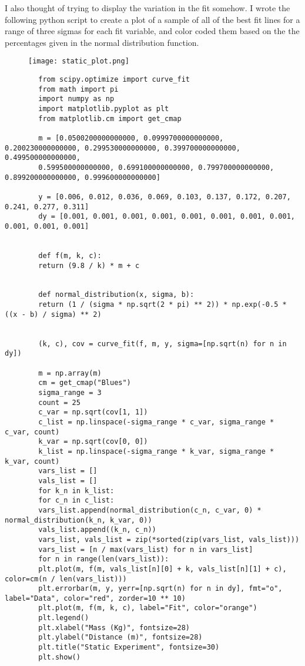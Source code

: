 \documentclass{article}
\begin{document}
    I also thought of trying to display the variation in the fit somehow. I wrote the following python script to create a plot of a sample of all of the best fit lines for a range of three sigmas for each fit variable, and color coded them based on the the percentages given in the normal distribution function.
    \begin{figure}[h]
        \centering
        \texttt{[image: static\_plot.png]}
    \end{figure}
    \begin{verbatim}
        from scipy.optimize import curve_fit
        from math import pi
        import numpy as np
        import matplotlib.pyplot as plt
        from matplotlib.cm import get_cmap

        m = [0.0500200000000000, 0.0999700000000000, 0.200230000000000, 0.299530000000000, 0.399700000000000, 0.499500000000000,
        0.599500000000000, 0.699100000000000, 0.799700000000000, 0.899200000000000, 0.999600000000000]

        y = [0.006, 0.012, 0.036, 0.069, 0.103, 0.137, 0.172, 0.207, 0.241, 0.277, 0.311]
        dy = [0.001, 0.001, 0.001, 0.001, 0.001, 0.001, 0.001, 0.001, 0.001, 0.001, 0.001]


        def f(m, k, c):
        return (9.8 / k) * m + c


        def normal_distribution(x, sigma, b):
        return (1 / (sigma * np.sqrt(2 * pi) ** 2)) * np.exp(-0.5 * ((x - b) / sigma) ** 2)


        (k, c), cov = curve_fit(f, m, y, sigma=[np.sqrt(n) for n in dy])

        m = np.array(m)
        cm = get_cmap("Blues")
        sigma_range = 3
        count = 25
        c_var = np.sqrt(cov[1, 1])
        c_list = np.linspace(-sigma_range * c_var, sigma_range * c_var, count)
        k_var = np.sqrt(cov[0, 0])
        k_list = np.linspace(-sigma_range * k_var, sigma_range * k_var, count)
        vars_list = []
        vals_list = []
        for k_n in k_list:
        for c_n in c_list:
        vars_list.append(normal_distribution(c_n, c_var, 0) * normal_distribution(k_n, k_var, 0))
        vals_list.append((k_n, c_n))
        vars_list, vals_list = zip(*sorted(zip(vars_list, vals_list)))
        vars_list = [n / max(vars_list) for n in vars_list]
        for n in range(len(vars_list)):
        plt.plot(m, f(m, vals_list[n][0] + k, vals_list[n][1] + c), color=cm(n / len(vars_list)))
        plt.errorbar(m, y, yerr=[np.sqrt(n) for n in dy], fmt="o", label="Data", color="red", zorder=10 ** 10)
        plt.plot(m, f(m, k, c), label="Fit", color="orange")
        plt.legend()
        plt.xlabel("Mass (Kg)", fontsize=28)
        plt.ylabel("Distance (m)", fontsize=28)
        plt.title("Static Experiment", fontsize=30)
        plt.show()

    \end{verbatim}
\end{document}
